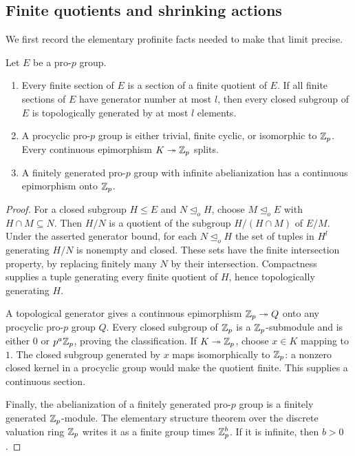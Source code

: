 \subsection{Finite quotients and shrinking actions}

We first record the elementary profinite facts needed to make that
limit precise.

\begin{lemma}\label{lem:profinite-elementary}
Let $E$ be a pro-$p$ group.
\begin{enumerate}[label=\textup{(\roman*)}]
\item Every finite section of $E$ is a section of a finite quotient of
$E$.  If all finite sections of $E$ have generator number at most $l$,
then every closed subgroup of $E$ is topologically generated by at most
$l$ elements.
\item A procyclic pro-$p$ group is either trivial, finite cyclic, or
isomorphic to $\mathbb Z_p$.  Every continuous epimorphism $K\twoheadrightarrow
\mathbb Z_p$ splits.
\item A finitely generated pro-$p$ group with infinite abelianization
has a continuous epimorphism onto $\mathbb Z_p$.
\end{enumerate}
\end{lemma}

\begin{proof}
For a closed subgroup $H\leq E$ and $N\trianglelefteq_o H$, choose
$M\trianglelefteq_o E$ with $H\cap M\subseteq N$.  Then $H/N$ is a
quotient of the subgroup $H/(H\cap M)$ of $E/M$.  Under the asserted
generator bound, for each $N\trianglelefteq_o H$ the set of tuples in
$H^l$ generating $H/N$ is nonempty and closed.  These sets have the
finite intersection property, by replacing finitely many $N$ by their
intersection.  Compactness supplies a tuple generating every finite
quotient of $H$, hence topologically generating $H$.

A topological generator gives a continuous epimorphism
$\mathbb Z_p\twoheadrightarrow Q$ onto any procyclic pro-$p$ group $Q$.
Every closed subgroup of $\mathbb Z_p$ is a $\mathbb Z_p$-submodule and is either
$0$ or $p^a\mathbb Z_p$, proving the classification.  If
$K\twoheadrightarrow\mathbb Z_p$, choose $x\in K$ mapping to $1$.
The closed subgroup generated by $x$ maps isomorphically to $\mathbb Z_p$:
a nonzero closed kernel in a procyclic group would make the quotient
finite.  This supplies a continuous section.

Finally, the abelianization of a finitely generated pro-$p$ group is a
finitely generated $\mathbb Z_p$-module.  The elementary structure theorem over
the discrete valuation ring $\mathbb Z_p$ writes it as a finite group times
$\mathbb Z_p^b$.  If it is infinite, then $b>0$.
\end{proof}

